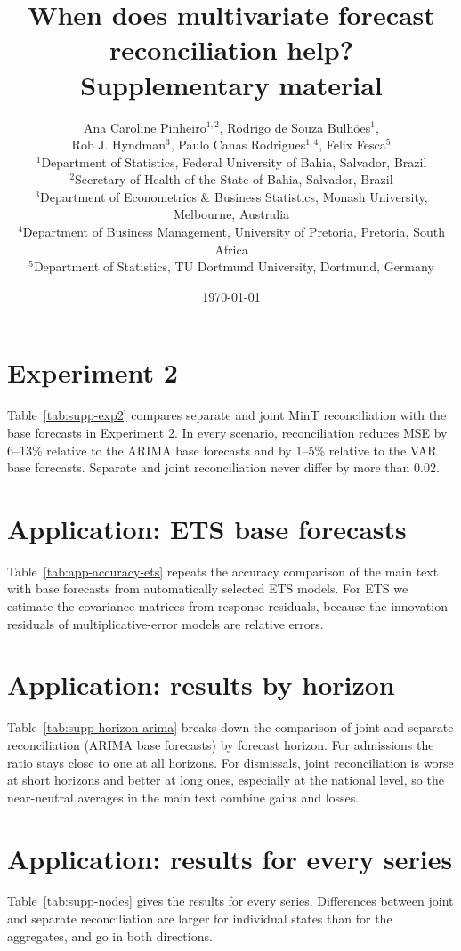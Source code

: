 \documentclass[a4paper, 12pt]{article}
\title{When does multivariate forecast reconciliation help?\\[0.3cm] \large Supplementary material}
\author{Ana Caroline Pinheiro$^{1,2}$, Rodrigo de Souza Bulh{\~o}es$^{1}$,\\ Rob J. Hyndman$^{3}$, Paulo Canas Rodrigues$^{1,4}$, Felix Fesca$^{5}$\\[0.3cm]
  \small $^1$Department of Statistics, Federal University of Bahia, Salvador, Brazil\\
  \small $^2$Secretary of Health of the State of Bahia, Salvador, Brazil\\
  \small $^3$Department of Econometrics \& Business Statistics, Monash University, Melbourne, Australia\\
  \small $^4$Department of Business Management, University of Pretoria, Pretoria, South Africa\\
  \small $^5$Department of Statistics, TU Dortmund University, Dortmund, Germany}
\date{\today}
\begin{document}
\maketitle

\section*{Experiment 2}

Table~\ref{tab:supp-exp2} compares separate and joint MinT reconciliation with the base forecasts in Experiment 2. In every scenario, reconciliation reduces MSE by 6--13\% relative to the ARIMA base forecasts and by 1--5\% relative to the VAR base forecasts. Separate and joint reconciliation never differ by more than 0.02.



\section*{Application: ETS base forecasts}

Table~\ref{tab:app-accuracy-ets} repeats the accuracy comparison of the main text with base forecasts from automatically selected ETS models. For ETS we estimate the covariance matrices from response residuals, because the innovation residuals of multiplicative-error models are relative errors.



\section*{Application: results by horizon}

Table~\ref{tab:supp-horizon-arima} breaks down the comparison of joint and separate reconciliation (ARIMA base forecasts) by forecast horizon. For admissions the ratio stays close to one at all horizons. For dismissals, joint reconciliation is worse at short horizons and better at long ones, especially at the national level, so the near-neutral averages in the main text combine gains and losses.



\section*{Application: results for every series}

Table~\ref{tab:supp-nodes} gives the results for every series. Differences between joint and separate reconciliation are larger for individual states than for the aggregates, and go in both directions.


\end{document}
